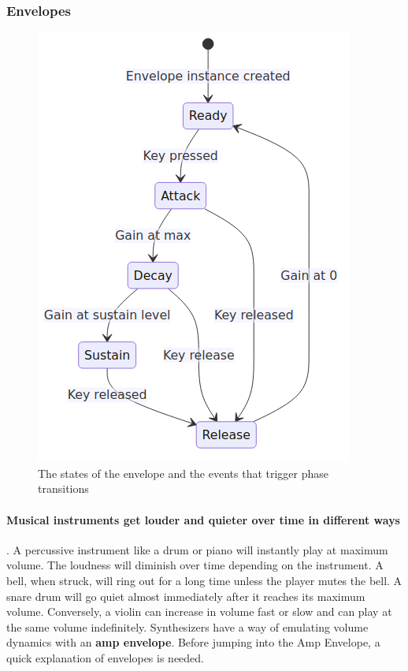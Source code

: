 \documentclass[acmlarge,screen]{acmart}
\begin{document}
	\subsubsection{Envelopes}
	
	\begin{figure}
		\centering
		\caption{The states of the envelope and the events that trigger phase transitions}
		\includegraphics[width=.8\linewidth]{envelope_state_diagram}
	\end{figure}
	
	\paragraph{Musical instruments get louder and quieter over time in different ways}. A percussive instrument like a drum or piano will instantly play at maximum volume. The loudness will diminish over time depending on the instrument. A bell, when struck, will ring out for a long time unless the player mutes the bell. A snare drum will go quiet almost immediately after it reaches its maximum volume. Conversely, a violin can increase in volume fast or slow and can play at the same volume indefinitely. Synthesizers have a way of emulating volume dynamics with an \textbf{amp envelope}. Before jumping into the Amp Envelope, a quick explanation of envelopes is needed. 
	
\end{document}
